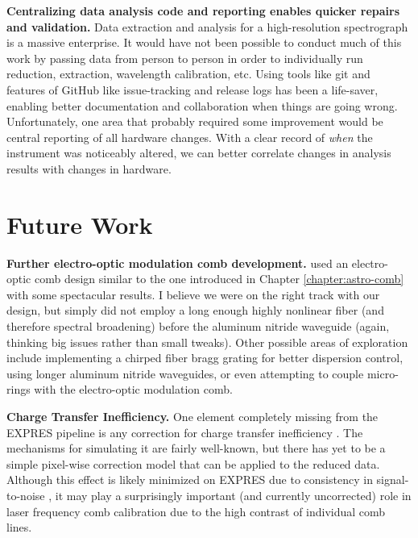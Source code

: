 \textbf{Centralizing data analysis code and reporting enables quicker repairs and validation.} Data extraction and analysis for a high-resolution spectrograph is a massive enterprise. It would have not been possible to conduct much of this work by passing data from person to person in order to individually run reduction, extraction, wavelength calibration, etc. Using tools like git and features of GitHub like issue-tracking and release logs has been a life-saver, enabling better documentation and collaboration when things are going wrong. Unfortunately, one area that probably required some improvement would be central reporting of all hardware changes. With a clear record of \textit{when} the instrument was noticeably altered, we can better correlate changes in analysis results with changes in hardware.

\section{Future Work} \label{conclusion:future}

\textbf{Further electro-optic modulation comb development.} \citet{obrzud_visible_2019} used an electro-optic comb design similar to the one introduced in Chapter \ref{chapter:astro-comb} with some spectacular results. I believe we were on the right track with our design, but simply did not employ a long enough highly nonlinear fiber (and therefore spectral broadening) before the aluminum nitride waveguide (again, thinking big issues rather than small tweaks). Other possible areas of exploration include implementing a chirped fiber bragg grating for better dispersion control, using longer aluminum nitride waveguides, or even attempting to couple micro-rings with the electro-optic modulation comb.

\textbf{Charge Transfer Inefficiency.} One element completely missing from the EXPRES pipeline is any correction for charge transfer inefficiency \citep{goudfrooij_empirical_2006, bouchy_charge_2009, blake_impact_2017}. The mechanisms for simulating it are fairly well-known, but there has yet to be a simple pixel-wise correction model that can be applied to the reduced data. Although this effect is likely minimized on EXPRES due to consistency in signal-to-noise \citep{blackman_performance_2020}, it may play a surprisingly important (and currently uncorrected) role in laser frequency comb calibration due to the high contrast of individual comb lines.

